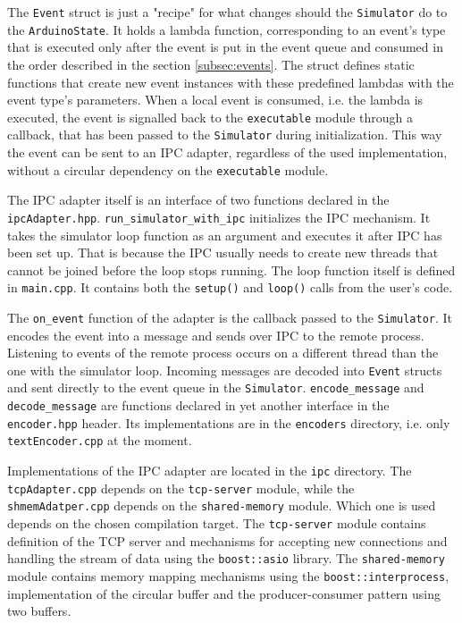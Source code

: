 The \texttt{Event} struct is just a "recipe" for what changes should the \texttt{Simulator} do to the \texttt{ArduinoState}. It holds a lambda function, corresponding to an event's type that is executed only after the event is put in the event queue and consumed in the order described in the section \ref{subsec:events}. The struct defines static functions that create new event instances with these predefined lambdas with the event type's parameters. When a local event is consumed, i.e. the lambda is executed, the event is signalled back to the \texttt{executable} module through a callback, that has been passed to the \texttt{Simulator} during initialization. This way the event can be sent to an IPC adapter, regardless of the used implementation, without a circular dependency on the \texttt{executable} module.

The IPC adapter itself is an interface of two functions declared in the \texttt{ipcAdapter.hpp}. \texttt{run\_simulator\_with\_ipc} initializes the IPC mechanism. It takes the simulator loop function as an argument and executes it after IPC has been set up. That is because the IPC usually needs to create new threads that cannot be joined before the loop stops running. The loop function itself is defined in \texttt{main.cpp}. It contains both the \texttt{setup()} and \texttt{loop()} calls from the user's code.

The \texttt{on\_event} function of the adapter is the callback passed to the \texttt{Simulator}. It encodes the event into a message and sends over IPC to the remote process. Listening to events of the remote process occurs on a different thread than the one with the simulator loop. Incoming messages are decoded into \texttt{Event} structs and sent directly to the event queue in the \texttt{Simulator}. \texttt{encode\_message} and \texttt{decode\_message} are functions declared in yet another interface in the \texttt{encoder.hpp} header. Its implementations are in the \texttt{encoders} directory, i.e. only \texttt{textEncoder.cpp} at the moment.

Implementations of the IPC adapter are located in the \texttt{ipc} directory. The \texttt{tcpAdapter.cpp} depends on the \texttt{tcp-server} module, while the \texttt{shmemAdatper.cpp} depends on the \texttt{shared-memory} module. Which one is used depends on the chosen compilation target. The \texttt{tcp-server} module contains definition of the TCP server and mechanisms for accepting new connections and handling the stream of data using the \texttt{boost::asio} library. The \texttt{shared-memory} module contains memory mapping mechanisms using the \texttt{boost::interprocess}, implementation of the circular buffer and the producer-consumer pattern using two buffers.

